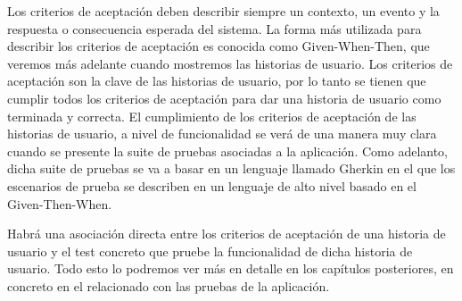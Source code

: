 Los criterios de aceptación deben describir siempre un contexto, un evento y la respuesta o consecuencia esperada del sistema. La forma más utilizada para describir los criterios de aceptación es conocida como Given-When-Then, que veremos más adelante cuando mostremos las historias de usuario. 
Los criterios de aceptación son la clave de las historias de usuario, por lo tanto se tienen que cumplir todos los criterios de aceptación para dar una historia de usuario como terminada y correcta. 
El cumplimiento de los criterios de aceptación de las historias de usuario, a nivel de funcionalidad se verá de una manera muy clara cuando se presente la suite de pruebas asociadas a la aplicación. Como adelanto, dicha suite de pruebas se va a basar en un lenguaje llamado Gherkin en el que los escenarios de prueba se describen en un lenguaje de alto nivel basado en el Given-Then-When.

Habrá una asociación directa entre los criterios de aceptación de una historia de usuario y el test concreto que pruebe la funcionalidad de dicha historia de usuario. Todo esto lo podremos ver más en detalle en los capítulos posteriores, en concreto en el relacionado con las pruebas de la aplicación. 

